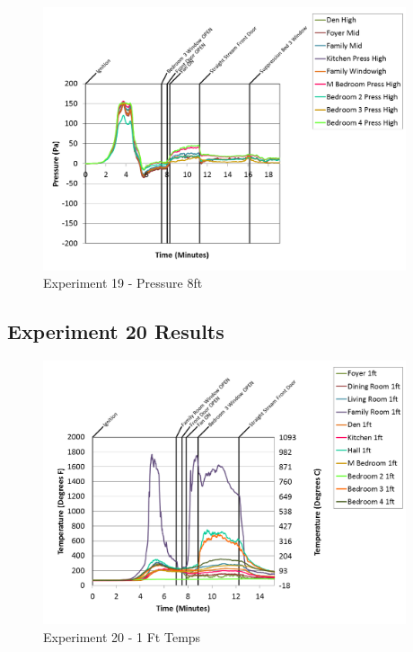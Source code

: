\documentclass{article}
\begin{document}
\begin{appendices}
\clearpage

\begin{figure}[h!]
	\centering
	\includegraphics[height=3.05in]{0_Images/Results_Charts/Exp_19_Charts/Pressure8ft.png}
	\caption{Experiment 19 - Pressure 8ft}
\end{figure}


\clearpage
\clearpage		\large
\subsection{Experiment 20 Results} \label{App:Exp20Results} 

\begin{figure}[h!]
	\centering
	\includegraphics[height=3.05in]{0_Images/Results_Charts/Exp_20_Charts/1FtTemps.png}
	\caption{Experiment 20 - 1 Ft Temps}
\end{figure}



\end{appendices}
\end{document}
